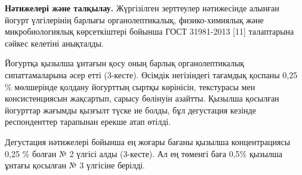 \begin{multicols}{2}
{\bfseries Нәтижелері және талқылау.} Жүргізілген зерттеулер нәтижесінде
алынған йогурт үлгілерінің барлығы органолептикалық, физико-химиялық
және микробиологиялық көрсеткіштері бойынша ГОСТ 31981-2013 {[}11{]}
талаптарына сәйкес келетіні анықталды.

Йогуртқа қызылша ұнтағын қосу оның барлық органолептикалық
сипаттамаларына әсер етті (3-кесте). Өсімдік негізіндегі тағамдық
қоспаны 0,25 \% мөлшерінде қолдану йогурттың сыртқы көрінісін,
текстурасы мен консистенциясын жақсартып, сарысу бөлінуін азайтты.
Қызылша қосылған йогурттар жағымды қызғылт түске ие болды, бұл
дегустация кезінде респонденттер тарапынан ерекше атап өтілді.

Дегустация нәтижелері бойынша ең жоғары бағаны қызылша концентрациясы
0,25 \% болған № 2 үлгісі алды (3-кесте). Ал ең төменгі баға 0,5\%
қызылша ұнтағы қосылған № 3 үлгісіне берілді.
\end{multicols}

